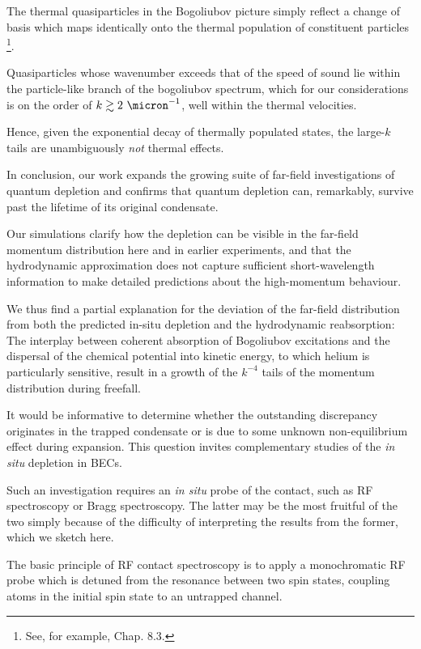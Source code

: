 	The thermal quasiparticles in the Bogoliubov picture simply reflect a change of basis which maps identically onto the thermal population of constituent particles \footnote{See, for example, \cite{PethickSmith} Chap.
	8.3.}.
	
	Quasiparticles whose wavenumber exceeds that of the speed of sound lie within the particle-like branch of the bogoliubov spectrum, which for our considerations is on the order of $k\gtrsim2~\micron^{-1}$, well within the thermal velocities.
	
	Hence, given the exponential decay of thermally populated states, the large-$k$ tails are unambiguously \emph{not} thermal effects.
	

	In conclusion, our work expands the growing suite of far-field investigations of quantum depletion \cite{Cayla20,Chang16} and confirms that quantum depletion can, remarkably, survive past the lifetime of its original condensate.
	
	Our simulations clarify how the depletion can be visible in the far-field momentum distribution here and in earlier experiments, and that the hydrodynamic approximation does not capture sufficient short-wavelength information to make detailed predictions about the high-momentum behaviour.
	
	We thus find a partial explanation for the deviation of the far-field distribution from both the predicted in-situ depletion and the hydrodynamic reabsorption: The interplay between coherent absorption of Bogoliubov excitations and the dispersal of the chemical potential into kinetic energy, to which helium is particularly sensitive, result in a growth of the $k^{-4}$ tails of the momentum distribution during freefall.
	

	It would be informative to determine whether the outstanding discrepancy originates in the trapped condensate or is due to some unknown non-equilibrium effect during expansion.
	This question invites complementary studies of the \emph{in situ} depletion in \mhe BECs.
	
	Such an investigation requires an \emph{in situ} probe of the contact, such as RF spectroscopy or Bragg spectroscopy.
	The latter may be the most fruitful of the two simply because of the difficulty of interpreting the results from the former, which we sketch here.
	
	
	The basic principle of RF contact spectroscopy is to apply a monochromatic RF probe which is detuned from the resonance between two spin states, coupling atoms in the initial spin state to an untrapped channel.
	
